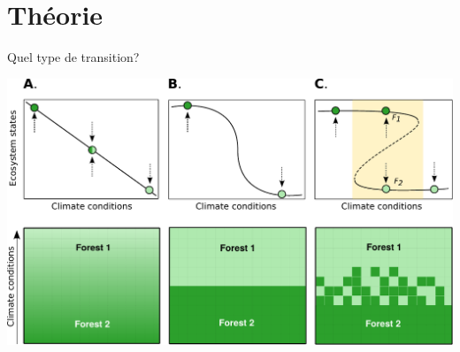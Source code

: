 \documentclass{eecslides}
\begin{document}
	\section{Théorie}
	





	\begin{frame}{Quel type de transition?}
		\begin{center}
		\includegraphics[height=0.6\textheight]{states}\\
		\end{center}
	\end{frame}

\end{document}
